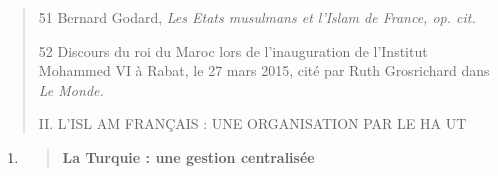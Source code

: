\begin{quote}
51 Bernard Godard, \emph{Les Etats musulmans et l'Islam de France, op.
cit.}

52 Discours du roi du Maroc lors de l'inauguration de l'Institut
Mohammed VI à Rabat, le 27 mars 2015, cité par Ruth Grosrichard dans
\emph{Le Monde.}

II. L'ISL AM FRANÇAIS : UNE ORGANISATION PAR LE HA UT
\end{quote}

\begin{enumerate}
\def\labelenumi{\arabic{enumi}.}
\setcounter{enumi}{2}
\item
  \begin{quote}
  \textbf{La Turquie : une gestion centralisée}
  \end{quote}
\end{enumerate}

